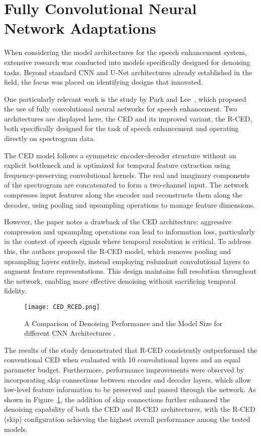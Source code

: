 \section{Fully Convolutional Neural Network Adaptations}
\label{sec:fcns}

When considering the model architectures for the speech enhancement system, extensive research was conducted into models specifically designed for denoising tasks. Beyond standard CNN and U-Net architectures already established in the field, the focus was placed on identifying designs that innovated.

One particularly relevant work is the study by Park and Lee~\cite{park2017acoustic}, which proposed the use of fully convolutional neural networks for speech enhancement. Two architectures are displayed here, the CED and its improved variant, the R-CED, both specifically designed for the task of speech enhancement and operating directly on spectrogram data.

The CED model follows a symmetric encoder-decoder structure without an explicit bottleneck and is optimized for temporal feature extraction using frequency-preserving convolutional kernels. The real and imaginary components of the spectrogram are concatenated to form a two-channel input. The network compresses input features along the encoder and reconstructs them along the decoder, using pooling and upsampling operations to manage feature dimensions.

However, the paper notes a drawback of the CED architecture: aggressive compression and upsampling operations can lead to information loss, particularly in the context of speech signals where temporal resolution is critical. To address this, the authors proposed the R-CED model, which removes pooling and upsampling layers entirely, instead employing redundant convolutional layers to augment feature representations. This design maintains full resolution throughout the network, enabling more effective denoising without sacrificing temporal fidelity.

\begin{figure}[H]
    \centering
    \texttt{[image: CED\_RCED.png]}
    \caption{A Comparison of Denoising Performance and the
    Model Size for different CNN Architectures \cite{park2017acoustic}.}
    \label{fig:fcns_results}
\end{figure}

The results of the study demonstrated that R-CED consistently outperformed the conventional CED when evaluated with 10 convolutional layers and an equal parameter budget. Furthermore, performance improvements were observed by incorporating skip connections between encoder and decoder layers, which allow low-level feature information to be preserved and passed through the network. As shown in Figure~\ref{fig:fcns_results}, the addition of skip connections further enhanced the denoising capability of both the CED and R-CED architectures, with the R-CED (skip) configuration achieving the highest overall performance among the tested models.


